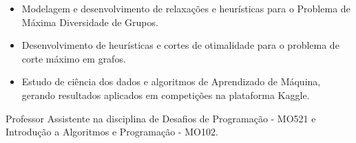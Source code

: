 \documentclass[10pt,a4paper,ragged2e,withhyper]{altacv}
\begin{document}
\begin{paracol}{2}
\begin{itemize}
        	\item Modelagem e desenvolvimento de relaxações e heurísticas para o Problema de Máxima Diversidade de Grupos.
        	\item Desenvolvimento de heurísticas e cortes de otimalidade para o problema de corte máximo em grafos.
        	\item Estudo de ciência dos dados e algoritmos de Aprendizado de Máquina, gerando resultados aplicados em competições na plataforma Kaggle.
        \end{itemize}

        \medskip
        {Professor Assistente na disciplina de Desafios de Programação - MO521 e Introdução a Algoritmos e Programação - MO102. \\}
        \divider
    \end{paracol}
    
\end{document}
